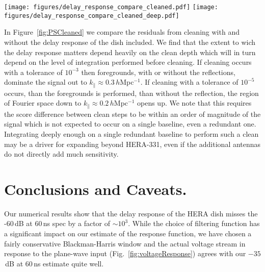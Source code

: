 \documentclass[useAMS,usenatbib]{mn2e}
\begin{document}
\begin{figure*}
\texttt{[image: figures/delay\_response\_compare\_cleaned.pdf]}
\texttt{[image: figures/delay\_response\_compare\_cleaned\_deep.pdf]}
\caption{Left: The foregrounds power spectrum formed from a $150-158$\,MHz subband. Blue and Green lines denote the Foregrounds with and without the delay response of the dish respectively. The Dashed red line shows the power spectrum residual of the foregrounds while the cyan line shows the power spectrum residuals with the antenna response. Cleaning was performed with a tolerance of $10^{-3}$. We see that at $10^{-3}$ tolerance, the region of Fourier space that is foreground free is identical with and without the reflections but extends to $k \approx 0.3$\,$h$Mpc$^{-1}$. Right: The same as the left except cleaning is performed with a tolerance of $10^{-5}$. When cleaning much deeper, one is able to remove foregrounds to lower $k_\parallel$ however the reflections continue to contaminate out to $0.3$\,$h$Mpc$^{-1}$ regardless of the clean depth. }
\label{fig:PSCleaned}
\end{figure*}

 In Figure~\ref{fig:PSCleaned} we compare the residuals from cleaning with and without the delay response of the dish included. We find that the extent to wich the delay response matters depend heavily on the clean depth which will in turn depend on the level of integration performed before cleaning. If cleaning occurs with a tolerance of $10^{-3}$ then foregrounds, with or without the reflections, dominate the signal out to $k_\parallel \approx 0.3$\,$h$Mpc$^{-1}$. If cleaning with a tolerance of $10^{-5}$ occurs, than the foregrounds is performed, than without the reflection, the region of Fourier space down to $k_\parallel \approx 0.2$\,$h$Mpc$^{-1}$ opens up. We note that this requires the score difference between clean steps to be within an order of magnitude of the signal which is not expected to occur on a single baseline, even a redundant one. Integrating deeply enough on a single redundant baseline to perform such a clean may be a driver for expanding beyond HERA-331, even if the additional antennas do not directly add much sensitivity. 


\section{Conclusions and Caveats.}

Our numerical results show that the delay response of the HERA dish misses the -60\,dB at 60\,ns spec by a factor of $\sim 10^3$. While the choice of filtering function has a significant impact on our estimate of the response function, we have chosen a fairly conservative Blackman-Harris window and the actual voltage stream in response to the plane-wave input (Fig.~\ref{fig:voltageResponse}) agrees with our $-35$\,dB at 60\,ns estimate quite well. 
\end{document}
